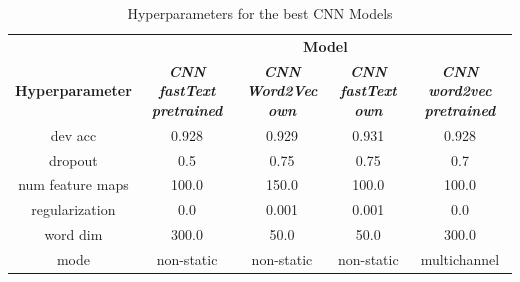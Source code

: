 \documentclass[conference]{IEEEtran}
\begin{document}
\begin{table}[htbp]
\caption{Hyperparameters for the best CNN Models}
\begin{center}
\begin{tabular}{|c|c|c|c|c|}
\hline
\textbf{}&\multicolumn{4}{|c|}{\textbf{Model}} \\ 
\cline{2-5}
\textbf{Hyperparameter} & \textbf{\textit{CNN fastText pretrained}}& \textbf{\textit{CNN Word2Vec own}}& \textbf{\textit{CNN fastText own}}& \textbf{\textit{CNN word2vec pretrained}} \\ 
\hline
dev acc & 0.928 & 0.929 & 0.931 & 0.928 \\ 
\hline
dropout & 0.5 & 0.75 & 0.75 & 0.7 \\ 
\hline
num feature maps & 100.0 & 150.0 & 100.0 & 100.0 \\ 
\hline
regularization & 0.0 & 0.001 & 0.001 & 0.0 \\ 
\hline
word dim & 300.0 & 50.0 & 50.0 & 300.0 \\ 
\hline
mode & non-static & non-static & non-static & multichannel \\ 
\hline
\end{tabular}
\label{taba4}
\end{center}
\end{table}
\end{document}

